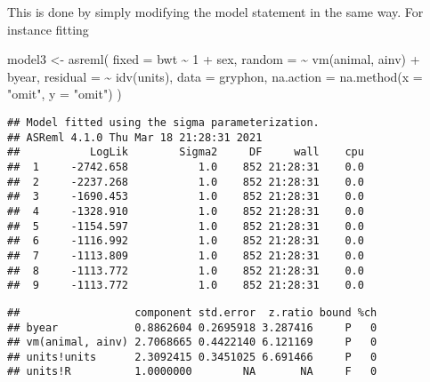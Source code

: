 \documentclass[
  12pt,
]{book}
\newenvironment{Shaded}{\begin{snugshade}}{\end{snugshade}}
\newcommand{\AttributeTok}[1]{\textcolor[rgb]{0.77,0.63,0.00}{#1}}
\newcommand{\DecValTok}[1]{\textcolor[rgb]{0.00,0.00,0.81}{#1}}
\newcommand{\FunctionTok}[1]{\textcolor[rgb]{0.00,0.00,0.00}{#1}}
\newcommand{\NormalTok}[1]{#1}
\newcommand{\OtherTok}[1]{\textcolor[rgb]{0.56,0.35,0.01}{#1}}
\newcommand{\SpecialCharTok}[1]{\textcolor[rgb]{0.00,0.00,0.00}{#1}}
\newcommand{\StringTok}[1]{\textcolor[rgb]{0.31,0.60,0.02}{#1}}
\begin{document}
This is done by simply modifying the model statement in the same way. For instance fitting

\begin{Shaded}
\begin{Highlighting}[]
\NormalTok{model3 }\OtherTok{\textless{}{-}} \FunctionTok{asreml}\NormalTok{(}
  \AttributeTok{fixed =}\NormalTok{ bwt }\SpecialCharTok{\textasciitilde{}} \DecValTok{1} \SpecialCharTok{+}\NormalTok{ sex,}
  \AttributeTok{random =} \SpecialCharTok{\textasciitilde{}} \FunctionTok{vm}\NormalTok{(animal, ainv) }\SpecialCharTok{+}\NormalTok{ byear,}
  \AttributeTok{residual =} \SpecialCharTok{\textasciitilde{}} \FunctionTok{idv}\NormalTok{(units),}
  \AttributeTok{data =}\NormalTok{ gryphon,}
  \AttributeTok{na.action =} \FunctionTok{na.method}\NormalTok{(}\AttributeTok{x =} \StringTok{"omit"}\NormalTok{, }\AttributeTok{y =} \StringTok{"omit"}\NormalTok{)}
\NormalTok{)}
\end{Highlighting}
\end{Shaded}

\begin{verbatim}
## Model fitted using the sigma parameterization.
## ASReml 4.1.0 Thu Mar 18 21:28:31 2021
##           LogLik        Sigma2     DF     wall    cpu
##  1     -2742.658           1.0    852 21:28:31    0.0
##  2     -2237.268           1.0    852 21:28:31    0.0
##  3     -1690.453           1.0    852 21:28:31    0.0
##  4     -1328.910           1.0    852 21:28:31    0.0
##  5     -1154.597           1.0    852 21:28:31    0.0
##  6     -1116.992           1.0    852 21:28:31    0.0
##  7     -1113.809           1.0    852 21:28:31    0.0
##  8     -1113.772           1.0    852 21:28:31    0.0
##  9     -1113.772           1.0    852 21:28:31    0.0
\end{verbatim}

\begin{Shaded}
\end{Shaded}

\begin{verbatim}
##                  component std.error  z.ratio bound %ch
## byear            0.8862604 0.2695918 3.287416     P   0
## vm(animal, ainv) 2.7068665 0.4422140 6.121169     P   0
## units!units      2.3092415 0.3451025 6.691466     P   0
## units!R          1.0000000        NA       NA     F   0
\end{verbatim}
\end{document}
